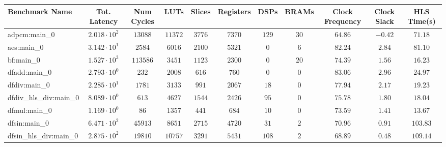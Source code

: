 \begin{tabular}{|l|c|c|c|c|c|c|c|c|c|c|}
\hline
Benchmark Name          & Tot. Latency           & Num Cycles & LUTs      & Slices    & Registers & DSPs    & BRAMs   & Clock Frequency & Clock Slack & HLS Time(s) \\
\hline
adpcm:main\_0           & $ 2.018 \cdot 10^{2} $ & $ 13088  $ & $ 11372 $ & $ 3776  $ & $ 7370  $ & $ 129 $ & $ 30  $ & $ 64.86       $ & $ -0.42   $ & $ 71.18   $ \\
aes:main\_0             & $ 3.142 \cdot 10^{1} $ & $ 2584   $ & $ 6016  $ & $ 2100  $ & $ 5321  $ & $ 0   $ & $ 6   $ & $ 82.24       $ & $ 2.84    $ & $ 81.10   $ \\
bf:main\_0              & $ 1.527 \cdot 10^{3} $ & $ 113586 $ & $ 3451  $ & $ 1123  $ & $ 2300  $ & $ 0   $ & $ 20  $ & $ 74.39       $ & $ 1.56    $ & $ 16.23   $ \\
dfadd:main\_0           & $ 2.793 \cdot 10^{0} $ & $ 232    $ & $ 2008  $ & $ 616   $ & $ 760   $ & $ 0   $ & $ 0   $ & $ 83.06       $ & $ 2.96    $ & $ 24.97   $ \\
dfdiv:main\_0           & $ 2.285 \cdot 10^{1} $ & $ 1781   $ & $ 3133  $ & $ 991   $ & $ 2067  $ & $ 18  $ & $ 0   $ & $ 77.94       $ & $ 2.17    $ & $ 19.23   $ \\
dfdiv\_hls\_div:main\_0 & $ 8.089 \cdot 10^{0} $ & $ 613    $ & $ 4627  $ & $ 1544  $ & $ 2426  $ & $ 95  $ & $ 0   $ & $ 75.78       $ & $ 1.80    $ & $ 18.04   $ \\
dfmul:main\_0           & $ 1.169 \cdot 10^{0} $ & $ 86     $ & $ 1357  $ & $ 441   $ & $ 684   $ & $ 10  $ & $ 0   $ & $ 73.59       $ & $ 1.41    $ & $ 13.67   $ \\
dfsin:main\_0           & $ 6.471 \cdot 10^{2} $ & $ 45913  $ & $ 8651  $ & $ 2715  $ & $ 4720  $ & $ 31  $ & $ 2   $ & $ 70.96       $ & $ 0.91    $ & $ 103.83  $ \\
dfsin\_hls\_div:main\_0 & $ 2.875 \cdot 10^{2} $ & $ 19810  $ & $ 10757 $ & $ 3291  $ & $ 5431  $ & $ 108 $ & $ 2   $ & $ 68.89       $ & $ 0.48    $ & $ 109.14  $ \\

\end{tabular}

